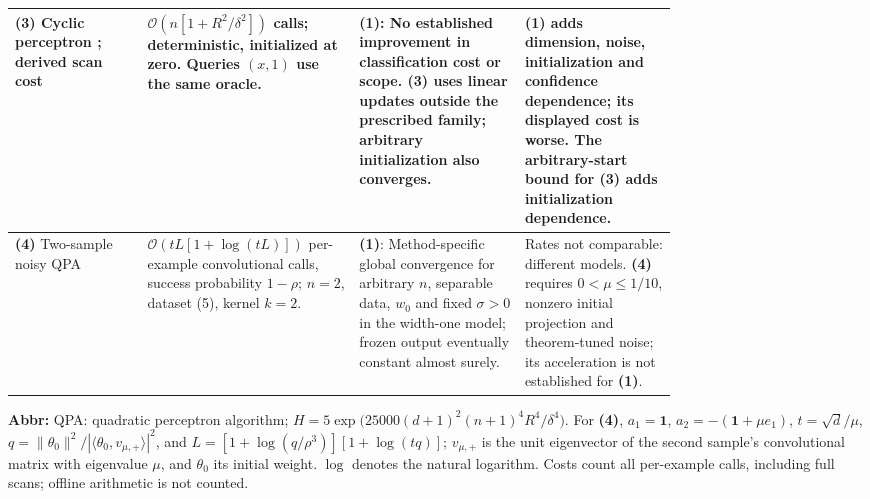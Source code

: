 \begin{table}[tp]
\begin{threeparttable}
\begin{tabularx}{\linewidth}{@{}>{\raggedright\arraybackslash}p{0.20\linewidth}>{\raggedright\arraybackslash}p{0.32\linewidth}>{\raggedright\arraybackslash}p{0.25\linewidth}>{\raggedright\arraybackslash}X@{}}
\midrule
\textbf{(3)} Cyclic perceptron \citep{nbqpNovikoff1962}; derived scan cost
& $\mathcal{O}\!\left(n[1+R^2/\delta^2]\right)$ calls; deterministic, initialized at zero. Queries $(x,1)$ use the same oracle.
& \textbf{(1)}: No established improvement in classification cost or scope. \textbf{(3)} uses linear updates outside the prescribed family; arbitrary initialization also converges.
& \textbf{(1)} adds dimension, noise, initialization and confidence dependence; its displayed cost is worse. The arbitrary-start bound for \textbf{(3)} adds initialization dependence. \\
\midrule
\textbf{(4)} Two-sample noisy QPA \citep[Theorem 5.1, v2]{nbqpTyurin2026v2}
& $\mathcal{O}\!\left(tL[1+\log(tL)]\right)$ per-example convolutional calls, success probability $1-\rho$; $n=2$, dataset (5), kernel $k=2$.
& \textbf{(1)}: Method-specific global convergence for arbitrary $n$, separable data, $w_0$ and fixed $\sigma>0$ in the width-one model; frozen output eventually constant almost surely.
& Rates not comparable: different models. \textbf{(4)} requires $0<\mu\le1/10$, nonzero initial projection and theorem-tuned noise; its acceleration is not established for \textbf{(1)}. \\
\bottomrule
\end{tabularx}
\begin{tablenotes}[flushleft]\footnotesize
\item[] \textbf{Abbr:} QPA: quadratic perceptron algorithm; $H=5\exp\!\bigl(25000(d+1)^2(n+1)^4R^4/\delta^4\bigr)$. For \textbf{(4)}, $a_1=\mathbf1$, $a_2=-(\mathbf1+\mu e_1)$, $t=\sqrt d/\mu$, $q=\|\theta_0\|^2/|\langle\theta_0,v_{\mu,+}\rangle|^2$, and $L=[1+\log(q/\rho^3)][1+\log(tq)]$; $v_{\mu,+}$ is the unit eigenvector of the second sample's convolutional matrix with eigenvalue $\mu$, and $\theta_0$ its initial weight. $\log$ denotes the natural logarithm. Costs count all per-example calls, including full scans; offline arithmetic is not counted.
\end{tablenotes}
\end{threeparttable}
\end{table}
